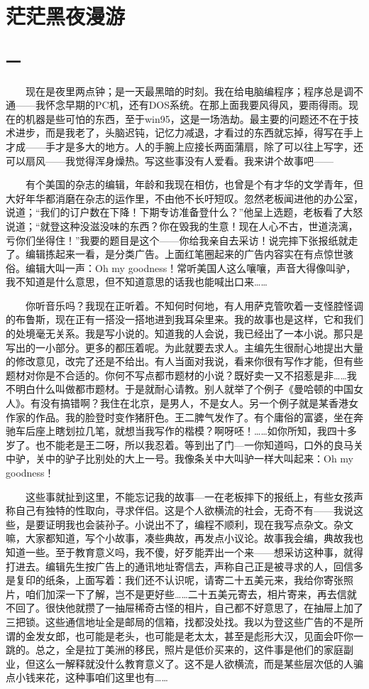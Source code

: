 \chapter{茫茫黑夜漫游}

\section{一} 

　　现在是夜里两点钟；是一天最黑暗的时刻。我在给电脑编程序；程序总是调不通——我怀念早期的PC机，还有DOS系统。在那上面我要风得风，要雨得雨。现在的机器是些可怕的东西，至于win95，这是一场浩劫。最主要的问题还不在于技术进步，而是我老了，头脑迟钝，记忆力减退，才看过的东西就忘掉，得写在手上才成——手才是多大的地方。人的手腕上应接长两面蒲扇，除了可以往上写字，还可以扇风——我觉得浑身燥热。写这些事没有人爱看。我来讲个故事吧—— 

　　有个美国的杂志的编辑，年龄和我现在相仿，也曾是个有才华的文学青年，但大好年华都消磨在杂志的运作里，不由他不长吁短叹。忽然老板闻进他的办公室，说道；“我们的订户数在下降！下期专访准备登什么？”他呈上选题，老板看了大怒说道；“就登这种没滋没味的东西？你在毁我的生意！现在人心不古，世道浇漓，亏你们坐得住！”我要的题目是这个——你给我亲自去采访！说完摔下张报纸就走了。编辑拣起来一看，是分类广告。上面红笔圈起来的广告内容实在有点惊世骇俗。编辑大叫一声：Oh my goodness！常听美国人这么嚷嚷，声音大得像叫驴，我不知道是什么意思，但不知道意思的话我也能喊出口来…… 

　　你听音乐吗？我现在正听着。不知何时何地，有人用萨克管吹着一支怪腔怪调的布鲁斯，现在正有一搭没一搭地进到我耳朵里来。我的故事也是这样，它和我们的处境毫无关系。我是写小说的。知道我的人会说，我已经出了一本小说。那只是写出的一小部分。更多的都压着呢。为此就要去求人。主编先生很耐心地提出大量的修改意见，改完了还是不给出。有人当面对我说，看来你很有写作才能，但有些题材对你是不合适的。你何不写点都市题材的小说？既好卖一又不招惹是非……我不明白什么叫做都市题材。于是就耐心请教。别人就举了个例子《曼哈顿的中国女人》。有没有搞错啊？我住在北京，是男人，不是女人。另一个例子就是某香港女作家的作品。我的脸登时变作猪肝色。王二脾气发作了。有个庸俗的富婆，坐在奔驰车后座上瞎划拉几笔，就想当我写作的楷模？啊呀呸！……如你所知，我四十多岁了。也不能老是王二呀，所以我忍着。等到出了门—一你知道吗，口外的良马关中驴，关中的驴子比别处的大上一号。我像条关中大叫驴一样大叫起来：Oh my goodness！ 

　　这些事就扯到这里，不能忘记我的故事—一在老板摔下的报纸上，有些女孩声称自己有独特的性取向，寻求伴侣。这是个人欲横流的社会，无奇不有——我说这些，是要证明我也会装孙子。小说出不了，编程不顺利，现在我写点杂文。杂文嘛，大家都知道，写个小故事，凑些典故，再发点小议论。故事我会编，典故我也知道一些。至于教育意义吗，我不傻，好歹能弄出一个来——想采访这种事，就得打进去。编辑先生按广告上的通讯地址寄信去，声称自己正是被寻求的人，回信多是复印的纸条，上面写着：我们还不认识呢，请寄二十五美元来，我给你寄张照片，咱们加深一下了解，岂不是更好些……二十五美元寄去，相片寄来，再去信就不回了。很快他就攒了一抽屉稀奇古怪的相片，自己都不好意思了，在抽屉上加了三把锁。这些通信地址全是邮局的信箱，找都没处找。我以为登这些广告的不是所谓的金发女郎，也可能是老头，也可能是老太太，甚至是彪形大汉，见面会吓你一跳的。总之，全是拉丁美洲的移民，照片是低价买来的，这件事是他们的家庭副业，但这么一解释就没什么教育意义了。这不是人欲横流，而是某些层次低的人骗点小钱来花，这种事咱们这里也有…… 

